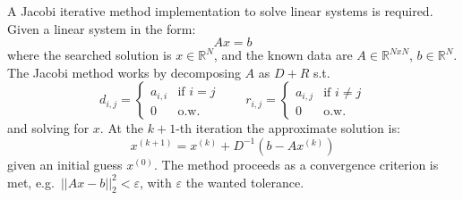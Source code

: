 A Jacobi iterative method implementation to solve linear systems is required.
Given a linear system in the form:
\begin{equation*}
	Ax = b
\end{equation*}
where the searched solution is $x \in \mathbb{R}^N$, and the known data are $A \in \mathbb{R}^{N x N}$, $b \in \mathbb{R}^N$.\\
The Jacobi method works by decomposing $A$ as $D + R$ s.t.\:
\begin{equation*}
d_{i, j} = \left\{ \begin{array}{ll}
a_{i, i} & \mbox{if $i = j$}\\
0 & \mbox{o.w.}\end{array} \right.
\qquad
r_{i, j} = \left\{ \begin{array}{ll}
a_{i, j} & \mbox{if $i \neq j$}\\
0 & \mbox{o.w.}\end{array} \right.
\end{equation*}
and solving for $x$.
At the $k+1$-th iteration the approximate solution is:
\begin{equation*}
x^{(k+1)} = x^{(k)} + D^{-1} (b - Ax^{(k)})
\end{equation*}
given an initial guess $x^{(0)}$.
The method proceeds as a convergence criterion is met, e.g.\ $|| A x - b ||_2^2 < \varepsilon$, with $\varepsilon$ the wanted tolerance.
